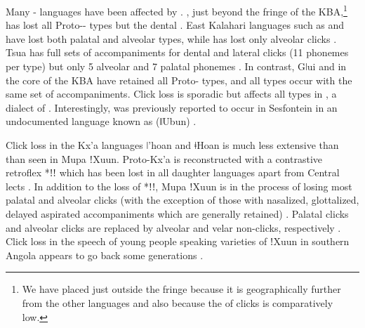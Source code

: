 \documentclass[output=paper,newtxmath,modfonts,nonflat,draftmode]{langsci/langscibook}
\begin{document}
Many - languages have been affected by  \citep{Traill1997}. , just beyond the fringe of the KBA,\footnote{We have placed  just outside the fringe because it is geographically further from the other languages and also because the  of clicks is comparatively low.} has lost all Proto--  types but the dental \citep{fehn-toappear-a}. East Kalahari  languages such as  and  have lost both palatal and alveolar  types, while  has lost only alveolar clicks \citep{fehn-toappear-a}. Tsua has full sets of accompaniments for dental and lateral clicks (11 phonemes per  type) but only 5 alveolar and 7 palatal  phonemes \citep{Mathes2016}. In contrast, Gǀui and  in the core of the KBA have retained all Proto-  types, and all  types occur with the same set of accompaniments. Click loss is sporadic but affects all  types in  \citep{Job2014}, a dialect of . Interestingly,  was previously reported to occur in Sesfontein in an undocumented  language known as  (ǁUbun) \citep[45]{vanwarmelo1951}. 

Click loss in the Kx'a languages ǀ'hoan and ǂHoan is much less extensive than than seen in Mupa ǃXuun. Proto-Kx'a is reconstructed with a contrastive retroflex  *ǃǃ which has been lost in all daughter languages apart from Central  lects \citep{Heine2010,Sands2010}. In addition to the loss of *ǃǃ, Mupa ǃXuun is in the process of losing most palatal and alveolar clicks (with the exception of those with nasalized, glottalized, delayed aspirated accompaniments which are generally retained) \citep{fehn-toappear-b}. Palatal clicks and alveolar clicks are replaced by alveolar and velar non-clicks, respectively \citep{fehn-toappear-b}. Click loss in the speech of young people speaking varieties of \linebreak ǃXuun in southern Angola appears to go back some generations \citep{Bleek1928,Traill1997}. 
\end{document}
